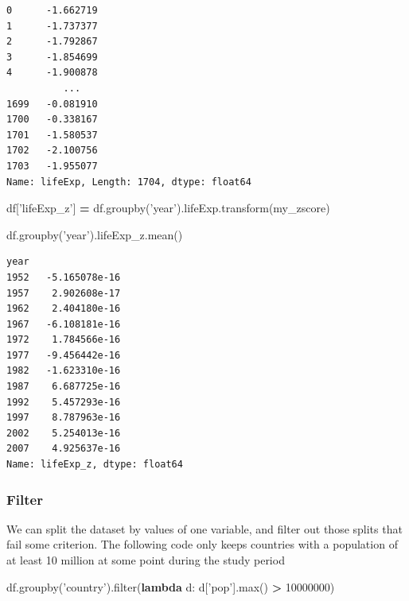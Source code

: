 \documentclass[
  letterpaper,
]{scrbook}
\newenvironment{Shaded}{\begin{snugshade}}{\end{snugshade}}
\newcommand{\BuiltInTok}[1]{#1}
\newcommand{\DecValTok}[1]{\textcolor[rgb]{0.00,0.00,0.81}{#1}}
\newcommand{\KeywordTok}[1]{\textcolor[rgb]{0.13,0.29,0.53}{\textbf{#1}}}
\newcommand{\NormalTok}[1]{#1}
\newcommand{\OperatorTok}[1]{\textcolor[rgb]{0.81,0.36,0.00}{\textbf{#1}}}
\newcommand{\StringTok}[1]{\textcolor[rgb]{0.31,0.60,0.02}{#1}}
\begin{document}
\begin{verbatim}
0      -1.662719
1      -1.737377
2      -1.792867
3      -1.854699
4      -1.900878
          ...   
1699   -0.081910
1700   -0.338167
1701   -1.580537
1702   -2.100756
1703   -1.955077
Name: lifeExp, Length: 1704, dtype: float64
\end{verbatim}

\begin{Shaded}
\begin{Highlighting}[]
\NormalTok{df[}\StringTok{'lifeExp_z'}\NormalTok{] }\OperatorTok{=}\NormalTok{ df.groupby(}\StringTok{'year'}\NormalTok{).lifeExp.transform(my_zscore)}
\end{Highlighting}
\end{Shaded}

\begin{Shaded}
\begin{Highlighting}[]
\NormalTok{df.groupby(}\StringTok{'year'}\NormalTok{).lifeExp_z.mean()}
\end{Highlighting}
\end{Shaded}

\begin{verbatim}
year
1952   -5.165078e-16
1957    2.902608e-17
1962    2.404180e-16
1967   -6.108181e-16
1972    1.784566e-16
1977   -9.456442e-16
1982   -1.623310e-16
1987    6.687725e-16
1992    5.457293e-16
1997    8.787963e-16
2002    5.254013e-16
2007    4.925637e-16
Name: lifeExp_z, dtype: float64
\end{verbatim}

\hypertarget{filter}{%
\subsubsection{Filter}\label{filter}}

We can split the dataset by values of one variable, and filter out those splits that fail some criterion. The following code only keeps countries with a population of at least 10 million at some point during the study period

\begin{Shaded}
\begin{Highlighting}[]
\NormalTok{df.groupby(}\StringTok{'country'}\NormalTok{).}\BuiltInTok{filter}\NormalTok{(}\KeywordTok{lambda}\NormalTok{ d: d[}\StringTok{'pop'}\NormalTok{].}\BuiltInTok{max}\NormalTok{() }\OperatorTok{>} \DecValTok{10000000}\NormalTok{)}
\end{Highlighting}
\end{Shaded}
\end{document}
